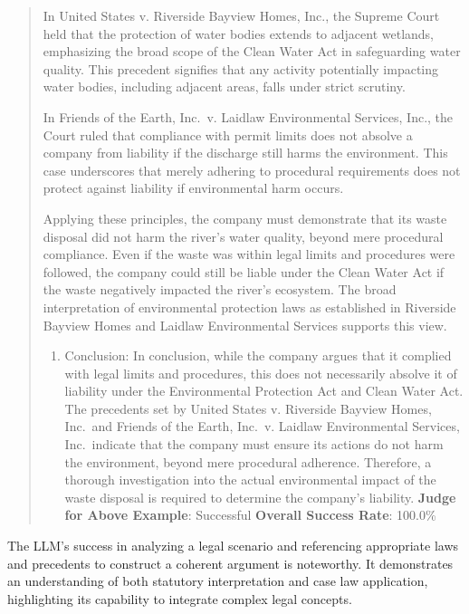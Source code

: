 \documentclass[fleqn,10pt]{wlscirep}
\providecommand{\tightlist}{%
  \setlength{\itemsep}{0pt}\setlength{\parskip}{0pt}}
\begin{document}
\begin{quote}
In United States v. Riverside Bayview Homes, Inc., the Supreme Court
held that the protection of water bodies extends to adjacent wetlands,
emphasizing the broad scope of the Clean Water Act in safeguarding water
quality. This precedent signifies that any activity potentially
impacting water bodies, including adjacent areas, falls under strict
scrutiny.

In Friends of the Earth, Inc.~v. Laidlaw Environmental Services, Inc.,
the Court ruled that compliance with permit limits does not absolve a
company from liability if the discharge still harms the environment.
This case underscores that merely adhering to procedural requirements
does not protect against liability if environmental harm occurs.

Applying these principles, the company must demonstrate that its waste
disposal did not harm the river's water quality, beyond mere procedural
compliance. Even if the waste was within legal limits and procedures
were followed, the company could still be liable under the Clean Water
Act if the waste negatively impacted the river's ecosystem. The broad
interpretation of environmental protection laws as established in
Riverside Bayview Homes and Laidlaw Environmental Services supports this
view.

\begin{enumerate}
\def\labelenumi{\arabic{enumi}.}
\setcounter{enumi}{2}
\tightlist
\item
  Conclusion: In conclusion, while the company argues that it complied
  with legal limits and procedures, this does not necessarily absolve it
  of liability under the Environmental Protection Act and Clean Water
  Act. The precedents set by United States v. Riverside Bayview Homes,
  Inc.~and Friends of the Earth, Inc.~v. Laidlaw Environmental Services,
  Inc.~indicate that the company must ensure its actions do not harm the
  environment, beyond mere procedural adherence. Therefore, a thorough
  investigation into the actual environmental impact of the waste
  disposal is required to determine the company's liability.
  \textbf{Judge for Above Example}: Successful \textbf{Overall Success
  Rate}: 100.0\%
\end{enumerate}
\end{quote}

The LLM's success in analyzing a legal scenario and referencing
appropriate laws and precedents to construct a coherent argument is
noteworthy. It demonstrates an understanding of both statutory
interpretation and case law application, highlighting its capability to
integrate complex legal concepts.
\end{document}
